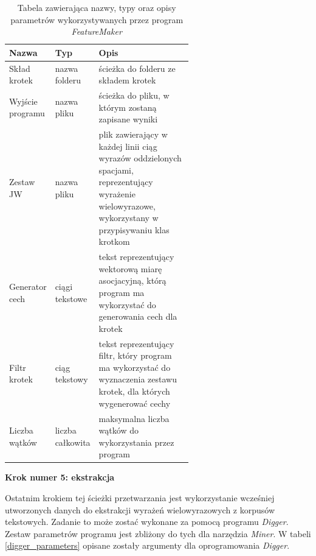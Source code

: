 \begin{table}[h!]
\centering
\begin{tabular}{l | l | p{0.6\linewidth}}
	\toprule 
	\textbf{Nazwa} & \textbf{Typ} & \textbf{Opis} \\
	\midrule 
	Skład krotek & nazwa folderu & ścieżka do folderu ze składem krotek \\ 
	\hline
	Wyjście programu & nazwa pliku & ścieżka do pliku, w którym zostaną zapisane wyniki\\ 
	\hline
	Zestaw JW & nazwa pliku & plik zawierający w każdej linii ciąg wyrazów oddzielonych spacjami, reprezentujący wyrażenie wielowyrazowe, wykorzystany w przypisywaniu klas krotkom\\ 
	\hline
	Generator cech & ciągi tekstowe & tekst reprezentujący wektorową miarę asocjacyjną, którą program ma wykorzystać do generowania cech dla krotek\\ 
	\hline
	Filtr krotek & ciąg tekstowy & tekst reprezentujący filtr, który program ma wykorzystać do wyznaczenia zestawu krotek, dla których wygenerować cechy\\ 
	\hline
	Liczba wątków & liczba całkowita & maksymalna liczba wątków do wykorzystania przez program\\ 
	\bottomrule
\end{tabular}
\caption[Parametry programu \emph{FeatureMaker}]{Tabela zawierająca nazwy, typy oraz opisy parametrów wykorzystywanych przez program \emph{FeatureMaker}}
\label{feature_maker_parameters}
\end{table}

\par
\noindent\textbf{Krok numer 5: ekstrakcja}
\par %
Ostatnim krokiem tej ścieżki przetwarzania jest wykorzystanie wcześniej utworzonych danych do ekstrakcji wyrażeń wielowyrazowych z korpusów tekstowych.
Zadanie to może zostać wykonane za pomocą programu \emph{Digger}.
Zestaw parametrów programu jest zbliżony do tych dla narzędzia \emph{Miner}.
W tabeli \ref{digger_parameters} opisane zostały argumenty dla oprogramowania \emph{Digger}.

